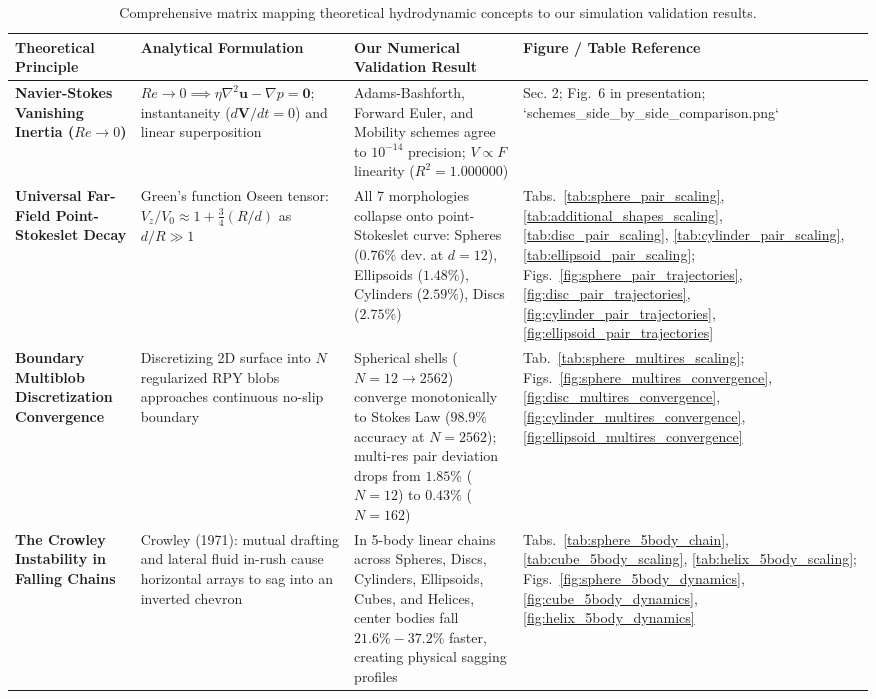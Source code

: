\documentclass[11pt,a4paper]{article}
\begin{document}
\begin{table}[htbp]
\centering
\small
\caption{Comprehensive matrix mapping theoretical hydrodynamic concepts to our simulation validation results.}
\label{tab:theory_validation_matrix}
\begin{tabular}{p{3.2cm}p{3.8cm}p{4.2cm}p{3.0cm}}
\toprule
\textbf{Theoretical Principle} & \textbf{Analytical Formulation} & \textbf{Our Numerical Validation Result} & \textbf{Figure / Table Reference} \\
\midrule
\textbf{Navier-Stokes Vanishing Inertia ($Re \to 0$)} & $Re \to 0 \implies \eta \nabla^2 \mathbf{u} - \nabla p = \mathbf{0}$; instantaneity ($d\mathbf{V}/dt = 0$) and linear superposition & Adams-Bashforth, Forward Euler, and Mobility schemes agree to $10^{-14}$ precision; $V \propto F$ linearity ($R^2 = 1.000000$) & Sec. 2; Fig.~6 in presentation; `schemes_side_by_side_comparison.png` \\
\midrule
\textbf{Universal Far-Field Point-Stokeslet Decay} & Green's function Oseen tensor: $V_z / V_0 \approx 1 + \frac{3}{4}(R/d)$ as $d/R \gg 1$ & All 7 morphologies collapse onto point-Stokeslet curve: Spheres ($0.76\%$ dev. at $d=12$), Ellipsoids ($1.48\%$), Cylinders ($2.59\%$), Discs ($2.75\%$) & Tabs.~\ref{tab:sphere_pair_scaling}, \ref{tab:additional_shapes_scaling}, \ref{tab:disc_pair_scaling}, \ref{tab:cylinder_pair_scaling}, \ref{tab:ellipsoid_pair_scaling}; Figs.~\ref{fig:sphere_pair_trajectories}, \ref{fig:disc_pair_trajectories}, \ref{fig:cylinder_pair_trajectories}, \ref{fig:ellipsoid_pair_trajectories} \\
\midrule
\textbf{Boundary Multiblob Discretization Convergence} & Discretizing 2D surface into $N$ regularized RPY blobs approaches continuous no-slip boundary & Spherical shells ($N=12 \to 2562$) converge monotonically to Stokes Law ($98.9\%$ accuracy at $N=2562$); multi-res pair deviation drops from $1.85\%$ ($N=12$) to $0.43\%$ ($N=162$) & Tab.~\ref{tab:sphere_multires_scaling}; Figs.~\ref{fig:sphere_multires_convergence}, \ref{fig:disc_multires_convergence}, \ref{fig:cylinder_multires_convergence}, \ref{fig:ellipsoid_multires_convergence} \\
\midrule
\textbf{The Crowley Instability in Falling Chains} & Crowley (1971): mutual drafting and lateral fluid in-rush cause horizontal arrays to sag into an inverted chevron & In 5-body linear chains across Spheres, Discs, Cylinders, Ellipsoids, Cubes, and Helices, center bodies fall $21.6\% - 37.2\%$ faster, creating physical sagging profiles & Tabs.~\ref{tab:sphere_5body_chain}, \ref{tab:cube_5body_scaling}, \ref{tab:helix_5body_scaling}; Figs.~\ref{fig:sphere_5body_dynamics}, \ref{fig:cube_5body_dynamics}, \ref{fig:helix_5body_dynamics} \\

\end{tabular}
\end{table}
\end{document}
